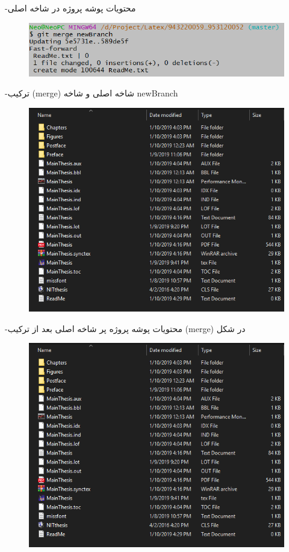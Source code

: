 -محتویات پوشه پروژه در شاخه اصلی

\begin{figure}[tbh]
	\centering
	\includegraphics[width=1\textwidth]{./Figures/n8}
	\caption{  }
	\label{n8}
\end{figure}
\newpage
-ترکیب (merge) شاخه اصلی و شاخه newBranch
\begin{figure}[tbh]
	\centering
	\includegraphics[width=1\textwidth]{./Figures/n9}
	\caption{  }
	\label{n9}
\end{figure}

-محتویات پوشه پروژه پر شاخه اصلی بعد از ترکیب (merge) در شکل
\begin{figure}[tbh]
	\centering
	\includegraphics[width=1\textwidth]{./Figures/n9}
	\caption{  }
	\label{n9}
\end{figure}
